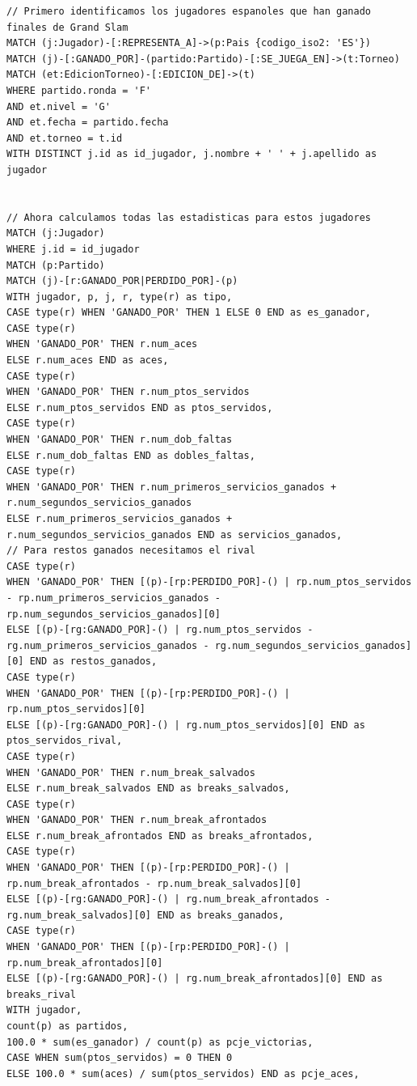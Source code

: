 \documentclass[11pt]{opticajnl}
\begin{document}
\begin{lstlisting}[language=Cypher]
// Primero identificamos los jugadores espanoles que han ganado finales de Grand Slam
MATCH (j:Jugador)-[:REPRESENTA_A]->(p:Pais {codigo_iso2: 'ES'})
MATCH (j)-[:GANADO_POR]-(partido:Partido)-[:SE_JUEGA_EN]->(t:Torneo)
MATCH (et:EdicionTorneo)-[:EDICION_DE]->(t)
WHERE partido.ronda = 'F'
AND et.nivel = 'G'
AND et.fecha = partido.fecha
AND et.torneo = t.id
WITH DISTINCT j.id as id_jugador, j.nombre + ' ' + j.apellido as jugador


// Ahora calculamos todas las estadisticas para estos jugadores
MATCH (j:Jugador)
WHERE j.id = id_jugador
MATCH (p:Partido)
MATCH (j)-[r:GANADO_POR|PERDIDO_POR]-(p)
WITH jugador, p, j, r, type(r) as tipo,
CASE type(r) WHEN 'GANADO_POR' THEN 1 ELSE 0 END as es_ganador,
CASE type(r)
WHEN 'GANADO_POR' THEN r.num_aces
ELSE r.num_aces END as aces,
CASE type(r)
WHEN 'GANADO_POR' THEN r.num_ptos_servidos
ELSE r.num_ptos_servidos END as ptos_servidos,
CASE type(r)
WHEN 'GANADO_POR' THEN r.num_dob_faltas
ELSE r.num_dob_faltas END as dobles_faltas,
CASE type(r)
WHEN 'GANADO_POR' THEN r.num_primeros_servicios_ganados + r.num_segundos_servicios_ganados
ELSE r.num_primeros_servicios_ganados + r.num_segundos_servicios_ganados END as servicios_ganados,
// Para restos ganados necesitamos el rival
CASE type(r)
WHEN 'GANADO_POR' THEN [(p)-[rp:PERDIDO_POR]-() | rp.num_ptos_servidos - rp.num_primeros_servicios_ganados - rp.num_segundos_servicios_ganados][0]
ELSE [(p)-[rg:GANADO_POR]-() | rg.num_ptos_servidos - rg.num_primeros_servicios_ganados - rg.num_segundos_servicios_ganados][0] END as restos_ganados,
CASE type(r)
WHEN 'GANADO_POR' THEN [(p)-[rp:PERDIDO_POR]-() | rp.num_ptos_servidos][0]
ELSE [(p)-[rg:GANADO_POR]-() | rg.num_ptos_servidos][0] END as ptos_servidos_rival,
CASE type(r)
WHEN 'GANADO_POR' THEN r.num_break_salvados
ELSE r.num_break_salvados END as breaks_salvados,
CASE type(r)
WHEN 'GANADO_POR' THEN r.num_break_afrontados
ELSE r.num_break_afrontados END as breaks_afrontados,
CASE type(r)
WHEN 'GANADO_POR' THEN [(p)-[rp:PERDIDO_POR]-() | rp.num_break_afrontados - rp.num_break_salvados][0]
ELSE [(p)-[rg:GANADO_POR]-() | rg.num_break_afrontados - rg.num_break_salvados][0] END as breaks_ganados,
CASE type(r)
WHEN 'GANADO_POR' THEN [(p)-[rp:PERDIDO_POR]-() | rp.num_break_afrontados][0]
ELSE [(p)-[rg:GANADO_POR]-() | rg.num_break_afrontados][0] END as breaks_rival
WITH jugador,
count(p) as partidos,
100.0 * sum(es_ganador) / count(p) as pcje_victorias,
CASE WHEN sum(ptos_servidos) = 0 THEN 0
ELSE 100.0 * sum(aces) / sum(ptos_servidos) END as pcje_aces,

\end{lstlisting}
\end{document}
